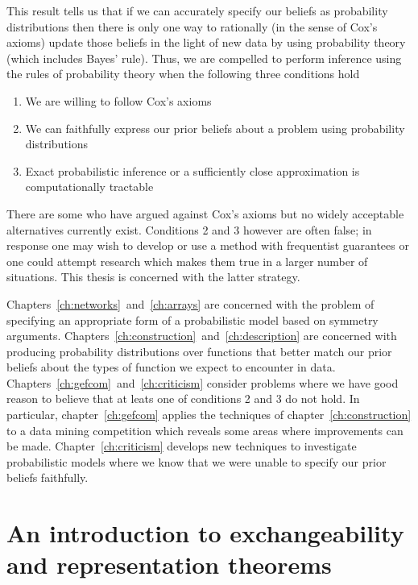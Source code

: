 This result tells us that if we can accurately specify our beliefs as probability distributions then there is only one way to rationally (in the sense of Cox's axioms) update those beliefs in the light of new data \ie by using probability theory (which includes Bayes' rule).
Thus, we are compelled to perform inference using the rules of probability theory when the following three conditions hold
\begin{enumerate}
  \item We are willing to follow Cox's axioms
  \item We can faithfully express our prior beliefs about a problem using probability distributions
  \item Exact probabilistic inference or a sufficiently close approximation is computationally tractable
\end{enumerate}
There are some who have argued against Cox's axioms but no widely acceptable alternatives currently exist.
Conditions 2 and 3 however are often false; in response one may wish to develop or use a method with frequentist guarantees or one could attempt research which makes them true in a larger number of situations\footnotemark{}.
This thesis is concerned with the latter strategy.


Chapters~\ref{ch:networks}~and~\ref{ch:arrays} are concerned with the problem of specifying an appropriate form of a probabilistic model based on symmetry arguments.
Chapters~\ref{ch:construction}~and~\ref{ch:description} are concerned with producing probability distributions over functions that better match our prior beliefs about the types of function we expect to encounter in data.
Chapters~\ref{ch:gefcom}~and~\ref{ch:criticism} consider problems where we have good reason to believe that at leats one of conditions 2 and 3 do not hold.
In particular, chapter~\ref{ch:gefcom} applies the techniques of chapter~\ref{ch:construction} to a data mining competition which reveals some areas where improvements can be made.
Chapter~\ref{ch:criticism} develops new techniques to investigate probabilistic models where we know that we were unable to specify our prior beliefs faithfully.

\section{An introduction to exchangeability and representation theorems}

